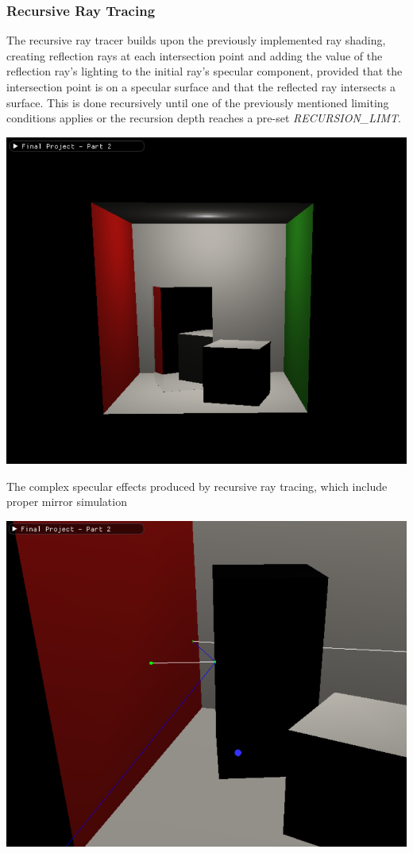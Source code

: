 \documentclass{article}
\begin{document}
    \subsubsection{Recursive Ray Tracing}
    The recursive ray tracer builds upon the previously implemented ray shading,
    creating reflection rays at each intersection point and adding the value of the reflection ray's lighting 
    to the initial ray's specular component, provided that the intersection point is on a specular surface 
    and that the reflected ray intersects a surface. This is done recursively until one of the previously 
    mentioned limiting conditions applies or the recursion depth reaches a pre-set \emph{RECURSION\_LIMT}.

    \begin{center}
        \includegraphics[scale=0.65]{images/recursive_ray_tracer_showcase}

        The complex specular effects produced by recursive ray tracing, which include proper mirror simulation

        \vspace{5mm}

        \includegraphics[scale=0.65]{images/recursive_ray_tracer_debug}


\end{center}
\end{document}
